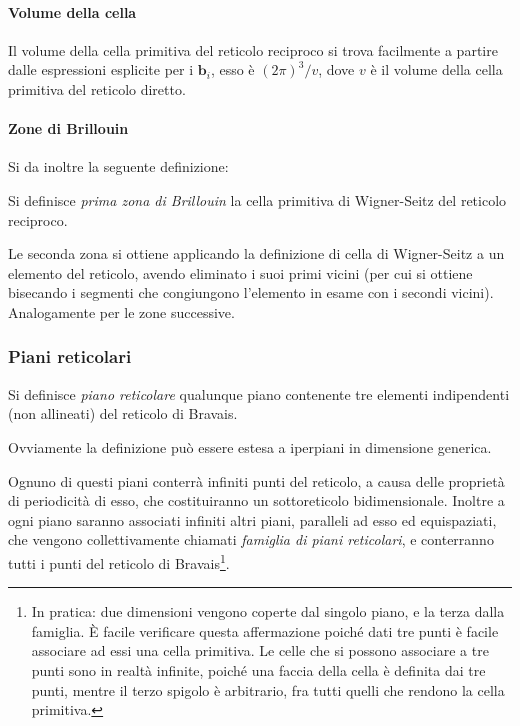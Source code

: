 \paragraph{Volume della cella} Il volume della cella primitiva del reticolo reciproco si trova facilmente a partire dalle espressioni esplicite per i $ \textbf{b}_i $, esso è $ (2\pi)^3/v $, dove $ v $ è il volume della cella primitiva del reticolo diretto.

\paragraph{Zone di Brillouin} Si da inoltre la seguente definizione:

\begin{defn}
	Si definisce \textit{prima zona di Brillouin} la cella primitiva di Wigner-Seitz del reticolo reciproco.
\end{defn}

Le seconda zona si ottiene applicando la definizione di cella di Wigner-Seitz a un elemento del reticolo, avendo eliminato i suoi primi vicini (per cui si ottiene bisecando i segmenti che congiungono l'elemento in esame con i secondi vicini).
Analogamente per le zone successive.

\subsubsection{Piani reticolari}

\begin{defn}
	Si definisce \textit{piano reticolare} qualunque piano contenente tre elementi indipendenti (non allineati) del reticolo di Bravais.
\end{defn}
Ovviamente la definizione può essere estesa a iperpiani in dimensione generica.

Ognuno di questi piani conterrà infiniti punti del reticolo, a causa delle proprietà di periodicità di esso, che costituiranno un sottoreticolo bidimensionale.
Inoltre a ogni piano saranno associati infiniti altri piani, paralleli ad esso ed equispaziati, che vengono collettivamente chiamati \textit{famiglia di piani reticolari}, e conterranno tutti i punti del reticolo di Bravais\footnote{In pratica: due dimensioni vengono coperte dal singolo piano, e la terza dalla famiglia. \`E facile verificare questa affermazione poiché dati tre punti è facile associare ad essi una cella primitiva. Le celle che si possono associare a tre punti sono in realtà infinite, poiché una faccia della cella è definita dai tre punti, mentre il terzo spigolo è arbitrario, fra tutti quelli che rendono la cella primitiva.}.

